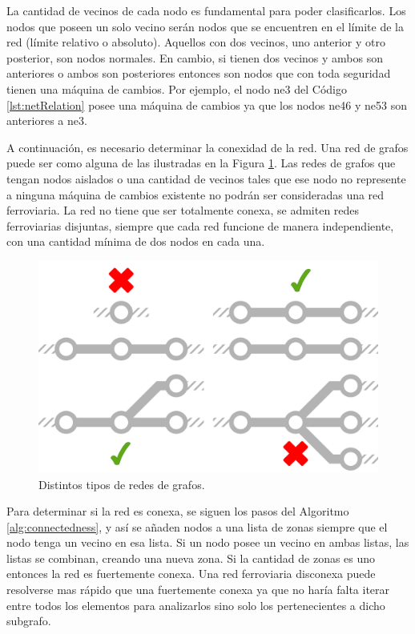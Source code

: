     La cantidad de vecinos de cada nodo es fundamental para poder clasificarlos. Los nodos que poseen un solo vecino serán nodos que se encuentren en el límite de la red (límite relativo o absoluto). Aquellos con dos vecinos, uno anterior y otro posterior, son nodos normales. En cambio, si tienen dos vecinos y ambos son anteriores o ambos son posteriores entonces son nodos que con toda seguridad tienen una máquina de cambios. Por ejemplo, el nodo ne3 del Código \ref{lst:netRelation} posee una máquina de cambios ya que los nodos ne46 y ne53 son anteriores a ne3.

    A continuación, es necesario determinar la conexidad de la red. Una red de grafos puede ser como alguna de las ilustradas en la Figura \ref{fig:conexidad}. Las redes de grafos que tengan nodos aislados o una cantidad de vecinos tales que ese nodo no represente a ninguna máquina de cambios existente no podrán ser consideradas una red ferroviaria. La red no tiene que ser totalmente conexa, se admiten redes ferroviarias disjuntas, siempre que cada red funcione de manera independiente, con una cantidad mínima de dos nodos en cada una.   

    \begin{figure}[H]
        \centering
        \includegraphics[width=1\textwidth]{Figuras/conexo.PNG}
        \centering\caption{Distintos tipos de redes de grafos.}
        \label{fig:conexidad}
    \end{figure}

    Para determinar si la red es conexa, se siguen los pasos del Algoritmo \ref{alg:connectedness}, y así se añaden nodos a una lista de zonas siempre que el nodo tenga un vecino en esa lista. Si un nodo posee un vecino en ambas listas, las listas se combinan, creando una nueva zona. Si la cantidad de zonas es uno entonces la red es fuertemente conexa. Una red ferroviaria disconexa puede resolverse mas rápido que una fuertemente conexa ya que no haría falta iterar entre todos los elementos para analizarlos sino solo los pertenecientes a dicho subgrafo.
        
